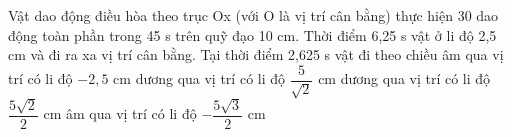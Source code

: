 






\begin{ex}%
Vật dao động điều hòa theo trục Ox (với O là vị trí cân bằng) thực hiện 30 dao động toàn phần trong 45 s trên quỹ đạo 10 cm. Thời điểm 6,25 s vật ở li độ 2,5 cm và đi ra xa vị trí cân bằng. Tại thời điểm 2,625 s vật đi theo chiều
\choice
{âm qua vị trí có li độ $-2,5$ cm}
{dương qua vị trí có li độ $\dfrac{5}{\sqrt{2}}$ cm}
{dương qua vị trí có li độ  $\dfrac{5\sqrt{2}}{2}$ cm}
{\True âm qua vị trí có li độ $-\dfrac{5\sqrt{3}}{2}$ cm}
\end{ex} 

